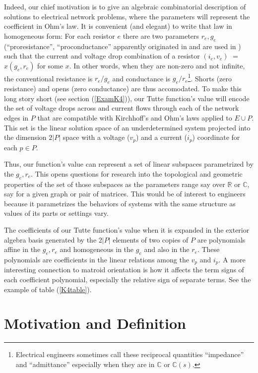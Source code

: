 \documentclass[Unicode]{cedram-alco}
\begin{document}
Indeed, our chief motivation is to give an algebraic combinatorial description of solutions
to electrical network problems, where the parameters will represent the coefficient
in Ohm's law.  It is convenient (and elegant) to write that law in homogeneous form:
For each resistor $e$ there
are two parameters $r_e,g_e$
(``proresistance'', ``proconductance'' apparently originated in \cite{SmithElec} and are used in
\cite{TutteEx,CirThProjHomo2019}) such that the current and voltage drop
combination of a resistor $(i_e,v_e)$ $=$ $x(g_e,r_e)$ for some $x$.
In other words, when they
are non-zero and not infinite, the conventional
resistance is $r_e/g_e$ and conductance is $g_e/r_e$\footnote{Electrical engineers
sometimes call these reciprocal quantities ``impedance'' and ``admittance'' especially
when they are in $\mathbb{C}$ or $\mathbb{C}(s)$.}. Shorts (zero resistance) and opens (zero
conductance) are thus accomodated.   To make this long story short (see section (\ref{ExamK4})),
our Tutte function's value
will encode the set of voltage drops across and current flows through each of
the network edges in $P$ that are compatible with Kirchhoff's and Ohm's laws applied to $E\cup P$. This set
is the linear solution space of an underdetermined system projected into the
dimension $2|P|$ space with a voltage ($v_{p}$) and a current ($i_{p}$) coordinate for each $p\in P$.

Thus, our function's value
can represent a set of linear subspaces parametrized by the $g_e, r_e$.
This opens questions for research into the topological and geometric properties
of the set of those subspaces
as the parameters range say over
$\mathbb{R}$ or $\mathbb{C}$, say for a given graph or pair of
matrices.  This would be of interest to engineers because it
parametrizes the behaviors of systems with the same structure
as values of its parts or settings vary.  

The coefficients of our Tutte function's value when it is expanded
in the exterior algebra basis
generated by the $2|P|$ elements of two copies of $P$
are polynomials affine in the $g_e, r_e$
and homogeneous in the $g_e$ and also in the $r_e$.
These polynomials are coefficients in the
linear relations among the $v_p$ and $i_p$.
A more interesting connection to matroid orientation is how it
affects the term signs of each coefficient polynomial,
especially the relative sign of separate terms.
See the example of table (\ref{K4table}).


\section{Motivation and Definition}
\end{document}
